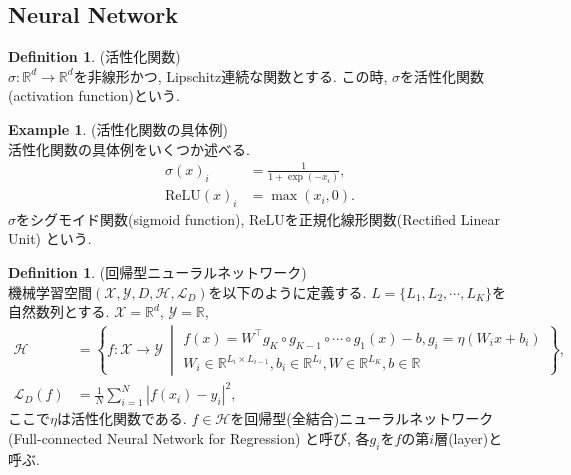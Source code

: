 \documentclass[11pt, a4paper, dvipdfmx]{jsarticle}
\theoremstyle{definition}
\newtheorem{Definition+}[Axiom+]{Definition}
\newtheorem{Example+}[Axiom+]{Example}
\newcommand{\R}{\mathbb{R}}
\newcommand{\X}{\mathcal{X}}
\newcommand{\Y}{\mathcal{Y}}
\newcommand{\Hil}{\mathcal{H}}
\newcommand{\Loss}{\mathcal{L}_{D}}
\newcommand{\MLsp}{(\X, \Y, D, \Hil, \Loss)}
\begin{document}
\subsection{Neural Network}
\begin{Definition+}(活性化関数)\\
    $\sigma:\R^{d}\to\R^{d}$を非線形かつ, Lipschitz連続な関数とする. 
    この時, $\sigma$を活性化関数(activation function)という.
\end{Definition+}
\begin{Example+}(活性化関数の具体例)\\
    活性化関数の具体例をいくつか述べる. 
    \begin{align*}
        \sigma(x)_{i} &= \frac{1}{1 + \exp(-x_{i})},\\
        \text{ReLU}(x)_{i} &= \max(x_{i}, 0).
    \end{align*}
    $\sigma$をシグモイド関数(sigmoid function), $\text{ReLU}$を正規化線形関数(Rectified Linear Unit)
    という.
\end{Example+}
\begin{Definition+}(回帰型ニューラルネットワーク)\\
    機械学習空間$\MLsp$を以下のように定義する. $L = \{L_{1}, L_{2}, \cdots, L_{K}\}$を自然数列とする.
    $\X = \R^d$, $\Y = \R$, 
    \begin{align*}
        \Hil &= \left\{f:\X\to\Y~\middle|
        \begin{array}{l}
            f(x) = W^{\top}g_{K}\circ g_{K - 1}\circ\cdots\circ g_{1}(x) - b, g_{i} = \eta(W_{i}x + b_{i})\\
            W_{i}\in\R^{L_{i}\times L_{i - 1}}, b_{i}\in\R^{L_{i}}, W\in\R^{L_{K}}, b\in\R
        \end{array}
        \right\},\\
        \Loss(f) &= \frac{1}{N}\sum_{i = 1}^{N}|f(x_i) - y_i|^2,
    \end{align*}
    ここで$\eta$は活性化関数である. $f\in\Hil$を回帰型(全結合)ニューラルネットワーク(Full-connected Neural Network for Regression)
    と呼び, 各$g_{i}$を$f$の第$i$層(layer)と呼ぶ.
\end{Definition+}
\end{document}
